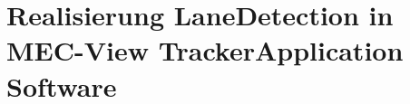 
\chapter{Realisierung LaneDetection in MEC-View TrackerApplication Software}
\label{cha:realisation_tracker}
